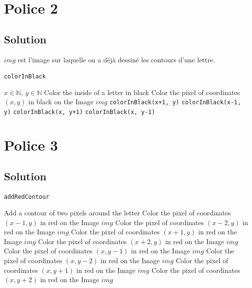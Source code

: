 \documentclass[a4paper, 12pt]{article}
\begin{document}
\newpage
\section{Police 2}	
\subsection{Solution}

$img$ est l'image sur laquelle on a déjà dessiné les contours d'une lettre.
 
\begin{algorithm}
	\caption{\texttt{colorInBlack}}
		\begin{algorithmic}[1]
		\Require $x \in \mathbb{N}$, $y \in \mathbb{N}$
		\Ensure Color the inside of a letter in black
			\State \Return
		\EndIf
			\State Color the pixel of coordinates $(x, y)$ in black on the Image $img$
			\State \texttt{colorInBlack(x+1, y)} 
			\State \texttt{colorInBlack(x-1, y)} 
			\State \texttt{colorInBlack(x, y+1)} 
			\State \texttt{colorInBlack(x, y-1)} 
		\EndIf	
		\EndFunction
		\end{algorithmic}
\end{algorithm}

\section{Police 3}			
\subsection{Solution}

\begin{algorithm}
	\caption{\texttt{addRedContour}}
		\begin{algorithmic}[1]
		\Require 
		\Ensure Add a contour of two pixels around the letter
					\State Color the pixel of coordinates $(x-1, y)$ in red on the Image $img$
					\State Color the pixel of coordinates $(x-2, y)$ in red on the Image $img$
				\EndIf
					\State Color the pixel of coordinates $(x+1, y)$ in red on the Image $img$
					\State Color the pixel of coordinates $(x+2, y)$ in red on the Image $img$
				\EndIf
					\State Color the pixel of coordinates $(x, y-1)$ in red on the Image $img$
					\State Color the pixel of coordinates $(x, y-2)$ in red on the Image $img$
				\EndIf
					\State Color the pixel of coordinates $(x, y+1)$ in red on the Image $img$
					\State Color the pixel of coordinates $(x, y+2)$ in red on the Image $img$ 
				\EndIf	
			\EndFor
		\EndFor
		\EndFunction
		\end{algorithmic}
\end{algorithm}
 
\end{document}
